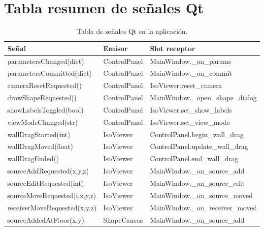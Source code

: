 \documentclass[11pt,a4paper]{article}
\begin{document}
\section{Tabla resumen de señales Qt}

\begin{table}[H]
\centering
\renewcommand{\arraystretch}{1.3}
\begin{tabular}{>{\ttfamily}l l >{\ttfamily}l}
\toprule
\normalfont\textbf{Señal} & \textbf{Emisor} & \normalfont\textbf{Slot receptor} \\
\midrule
parametersChanged(dict)      & ControlPanel  & MainWindow.\_on\_params \\
parametersCommitted(dict)    & ControlPanel  & MainWindow.\_on\_commit \\
cameraResetRequested()       & ControlPanel  & IsoViewer.reset\_camera \\
drawShapeRequested()         & ControlPanel  & MainWindow.\_open\_shape\_dialog \\
showLabelsToggled(bool)      & ControlPanel  & IsoViewer.set\_show\_labels \\
viewModeChanged(str)         & ControlPanel  & IsoViewer.set\_view\_mode \\
wallDragStarted(int)         & IsoViewer     & ControlPanel.begin\_wall\_drag \\
wallDragMoved(float)         & IsoViewer     & ControlPanel.update\_wall\_drag \\
wallDragEnded()              & IsoViewer     & ControlPanel.end\_wall\_drag \\
sourceAddRequested(x,y,z)    & IsoViewer     & MainWindow.\_on\_source\_add \\
sourceEditRequested(int)     & IsoViewer     & MainWindow.\_on\_source\_edit \\
sourceMoveRequested(i,x,y,z) & IsoViewer     & MainWindow.\_on\_source\_moved \\
receiverMoveRequested(x,y,z) & IsoViewer     & MainWindow.\_on\_receiver\_moved \\
sourceAddedAtFloor(x,y)      & ShapeCanvas   & MainWindow.\_on\_source\_add \\
\bottomrule
\end{tabular}
\caption{Tabla de señales Qt en la aplicación.}
\end{table}

\end{document}
